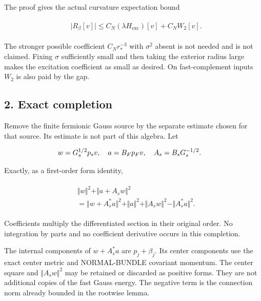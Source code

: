 The proof gives the actual curvature expectation bound

\begin{gather*}
\begin{aligned}
& \vert R_{\beta}[v]\vert  \le  C_{N}(\lambda  H_{\mathrm{exc}})[v]+C_{N} W_{2}[v].
\end{aligned}\tag{1.4}
\end{gather*}

The stronger possible coefficient \(C_{N} r_{*}^{-3}\) with
\(\sigma ^{2}\) absent is not needed and is not claimed. Fixing
\(\sigma\) sufficiently small and then taking the exterior radius large
makes the excitation coefficient as small as desired. On fast-complement
inputs \(W_{2}\) is also paid by the gap.

\subsection{2. Exact completion}\label{g-exact-completion}

Remove the finite fermionic Gauss source by the separate estimate chosen
for that source. Its estimate is not part of this algebra. Let

\begin{gather*}
\begin{aligned}
& w=G_{s}^{1/2} p_{s} v, \quad  a=B_{F} p_{F} v, \quad  A_{s}=B_{s} G_{s}^{-1/2}.
\end{aligned}\notag
\end{gather*}

Exactly, as a first-order form identity,

\begin{gather*}
\begin{aligned}
& \Vert w\Vert ^{2}+\Vert a+A_{s} w\Vert ^{2} \\
& =\Vert w+A_{s}^{*}a\Vert ^{2}+\Vert a\Vert ^{2}+\Vert A_{s} w\Vert ^{2}-\Vert A_{s}^{*}a\Vert ^{2}.
\end{aligned}\tag{2.1}
\end{gather*}

Coefficients multiply the differentiated section in their original
order. No integration by parts and no coefficient derivative occurs in
this completion.

The internal components of \(w+A_{s}^{*}a\) are \(p_{j}+\beta _{j}\).
Its center components use the exact center metric and NORMAL-BUNDLE
covariant momentum. The center square and \(\Vert A_{s} w\Vert ^{2}\)
may be retained or discarded as positive forms. They are not additional
copies of the fast Gauss energy. The negative term is the connection
norm already bounded in the rootwise lemma.

